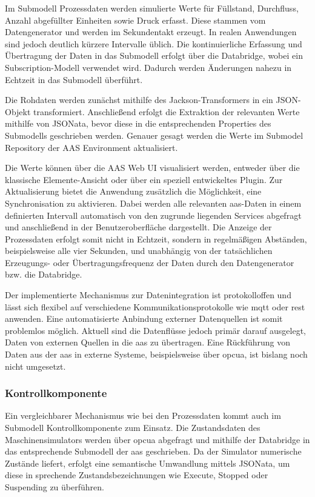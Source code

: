 Im Submodell Prozessdaten werden simulierte Werte für Füllstand, Durchfluss, Anzahl abgefüllter Einheiten sowie Druck erfasst.
Diese stammen vom Datengenerator und werden im Sekundentakt erzeugt.
In realen Anwendungen sind jedoch deutlich kürzere Intervalle üblich.
Die kontinuierliche Erfassung und Übertragung der Daten in das Submodell erfolgt über die Databridge, wobei ein Subscription-Modell verwendet wird.
Dadurch werden Änderungen nahezu in Echtzeit in das Submodell überführt.

Die Rohdaten werden zunächst mithilfe des Jackson-Transformers in ein JSON-Objekt transformiert.
Anschließend erfolgt die Extraktion der relevanten Werte mithilfe von JSONata, bevor diese in die entsprechenden Properties des Submodells geschrieben werden.
Genauer gesagt werden die Werte im Submodel Repository der AAS Environment aktualisiert.

Die Werte können über die AAS Web UI visualisiert werden, entweder über die klassische Elemente-Ansicht oder über ein speziell entwickeltes Plugin.
Zur Aktualisierung bietet die Anwendung zusätzlich die Möglichkeit, eine Synchronisation zu aktivieren.
Dabei werden alle relevanten \acs{aas}-Daten in einem definierten Intervall automatisch von den zugrunde liegenden Services abgefragt und anschließend in der Benutzeroberfläche dargestellt.
Die Anzeige der Prozessdaten erfolgt somit nicht in Echtzeit, sondern in regelmäßigen Abständen, beispielsweise alle vier Sekunden, und unabhängig von der tatsächlichen Erzeugungs- oder Übertragungsfrequenz der Daten durch den Datengenerator bzw. die Databridge.


Der implementierte Mechanismus zur Datenintegration ist protokolloffen und lässt sich flexibel auf verschiedene Kommunikationsprotokolle wie \acs{mqtt} oder \acs{rest} anwenden.
Eine automatisierte Anbindung externer Datenquellen ist somit problemlos möglich.
Aktuell sind die Datenflüsse jedoch primär darauf ausgelegt, Daten von externen Quellen in die \acs{aas} zu übertragen.
Eine Rückführung von Daten aus der \acs{aas} in externe Systeme, beispielsweise über \acs{opcua}, ist bislang noch nicht umgesetzt.

\subsubsection*{Kontrollkomponente}
\vspace{-0.5em}
Ein vergleichbarer Mechanismus wie bei den Prozessdaten kommt auch im Submodell Kontrollkomponente zum Einsatz. 
Die Zustandsdaten des Maschinensimulators werden über \acs{opcua} abgefragt und mithilfe der Databridge in das entsprechende Submodell der \acs{aas} geschrieben. 
Da der Simulator numerische Zustände liefert, erfolgt eine semantische Umwandlung mittels JSONata, um diese in sprechende Zustandsbezeichnungen wie Execute, Stopped oder Suspending zu überführen.

